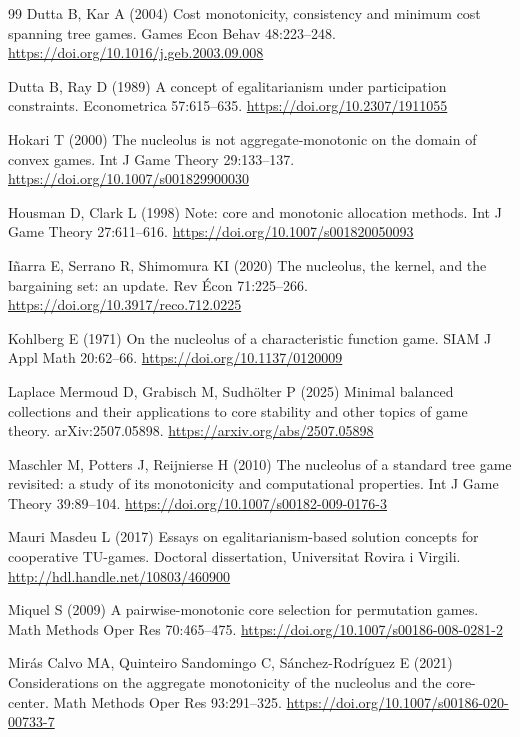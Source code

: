 \documentclass[11pt]{article}
\begin{document}
\begin{thebibliography}{99}
Dutta B, Kar A (2004) Cost monotonicity, consistency and minimum cost
spanning tree games. Games Econ Behav 48:223--248.
\url{https://doi.org/10.1016/j.geb.2003.09.008}

Dutta B, Ray D (1989) A concept of egalitarianism under participation
constraints. Econometrica 57:615--635.
\url{https://doi.org/10.2307/1911055}

Hokari T (2000) The nucleolus is not aggregate-monotonic on the domain of
convex games. Int J Game Theory 29:133--137.
\url{https://doi.org/10.1007/s001829900030}

Housman D, Clark L (1998) Note: core and monotonic allocation methods.
Int J Game Theory 27:611--616.
\url{https://doi.org/10.1007/s001820050093}

I\~narra E, Serrano R, Shimomura KI (2020) The nucleolus, the kernel, and
the bargaining set: an update. Rev \'Econ 71:225--266.
\url{https://doi.org/10.3917/reco.712.0225}

Kohlberg E (1971) On the nucleolus of a characteristic function game.
SIAM J Appl Math 20:62--66.
\url{https://doi.org/10.1137/0120009}

Laplace Mermoud D, Grabisch M, Sudh\"olter P (2025) Minimal balanced
collections and their applications to core stability and other topics of
game theory. arXiv:2507.05898.
\url{https://arxiv.org/abs/2507.05898}

Maschler M, Potters J, Reijnierse H (2010) The nucleolus of a standard
tree game revisited: a study of its monotonicity and computational
properties. Int J Game Theory 39:89--104.
\url{https://doi.org/10.1007/s00182-009-0176-3}

Mauri Masdeu L (2017) Essays on egalitarianism-based solution concepts for
cooperative TU-games. Doctoral dissertation, Universitat Rovira i Virgili.
\url{http://hdl.handle.net/10803/460900}

Miquel S (2009) A pairwise-monotonic core selection for permutation games.
Math Methods Oper Res 70:465--475.
\url{https://doi.org/10.1007/s00186-008-0281-2}

Mir\'as Calvo MA, Quinteiro Sandomingo C, S\'anchez-Rodr\'iguez E (2021)
Considerations on the aggregate monotonicity of the nucleolus and the
core-center. Math Methods Oper Res 93:291--325.
\url{https://doi.org/10.1007/s00186-020-00733-7}


\end{thebibliography}
\end{document}
